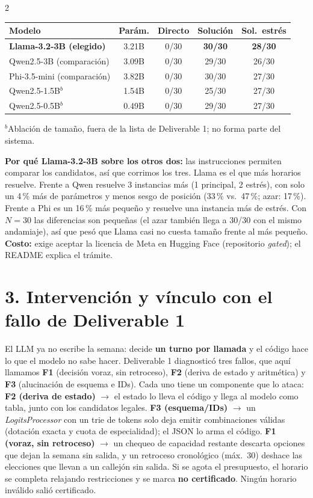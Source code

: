 \documentclass[9pt,a4paper]{extarticle}
\newcommand{\tabfont}{\fontsize{7.2}{8.3}\selectfont\setlength{\tabcolsep}{3.2pt}}
\newcommand{\notefont}{\fontsize{6.6}{7.6}\selectfont}
\begin{document}
\begin{multicols}{2}
\smallskip
{\centering\tabfont
\begin{tabular}{@{}lcccc@{}}
\toprule
\textbf{Modelo} & \textbf{Parám.} & \textbf{Directo} & \textbf{Solución} & \textbf{Sol.\ estrés} \\
\midrule
\textbf{Llama-3.2-3B (elegido)} & 3.21B & 0/30 & \textbf{30/30} & \textbf{28/30} \\
Qwen2.5-3B (comparación) & 3.09B & 0/30 & 29/30 & 26/30 \\
Phi-3.5-mini (comparación) & 3.82B & 0/30 & 30/30 & 27/30 \\
\midrule
Qwen2.5-1.5B$^{b}$ & 1.54B & 0/30 & 25/30 & 27/30 \\
Qwen2.5-0.5B$^{b}$ & 0.49B & 0/30 & 29/30 & 27/30 \\
\bottomrule
\end{tabular}\par}
{\notefont $^{b}$Ablación de tamaño, fuera de la lista de Deliverable 1; no forma parte del sistema.\par}
\textbf{Por qué Llama-3.2-3B sobre los otros dos:} las instrucciones permiten comparar los candidatos, así que corrimos los tres. Llama es el que más horarios resuelve. Frente a Qwen resuelve 3 instancias más (1 principal, 2 estrés), con solo un 4\,\% más de parámetros y menos sesgo de posición (33\,\% vs.\ 47\,\%; azar: 17\,\%). Frente a Phi es un 16\,\% más pequeño y resuelve una instancia más de estrés. Con $N=30$ las diferencias son pequeñas (el azar también llega a 30/30 con el mismo andamiaje), así que pesó que Llama casi no cuesta tamaño frente al más pequeño. \textbf{Costo:} exige aceptar la licencia de Meta en Hugging Face (repositorio \emph{gated}); el README explica el trámite.

\section{3. Intervención y vínculo con el fallo de Deliverable 1}
El LLM ya no escribe la semana: decide \textbf{un turno por llamada} y el código hace lo que el modelo no sabe hacer. Deliverable 1 diagnosticó tres fallos, que aquí llamamos \textbf{F1} (decisión voraz, sin retroceso), \textbf{F2} (deriva de estado y aritmética) y \textbf{F3} (alucinación de esquema e IDs). Cada uno tiene un componente que lo ataca:
\textbf{F2 (deriva de estado)} $\to$ el estado lo lleva el código y llega al modelo como tabla, junto con los candidatos legales.
\textbf{F3 (esquema/IDs)} $\to$ un \emph{LogitsProcessor} con un trie de tokens solo deja emitir combinaciones válidas (dotación exacta y cuota de especialidad); el JSON lo arma el código.
\textbf{F1 (voraz, sin retroceso)} $\to$ un chequeo de capacidad restante descarta opciones que dejan la semana sin salida, y un retroceso cronológico (máx.\ 30) deshace las elecciones que llevan a un callejón sin salida.
Si se agota el presupuesto, el horario se completa relajando restricciones y se marca \textbf{no certificado}. Ningún horario inválido salió certificado.


\end{multicols}
\end{document}
